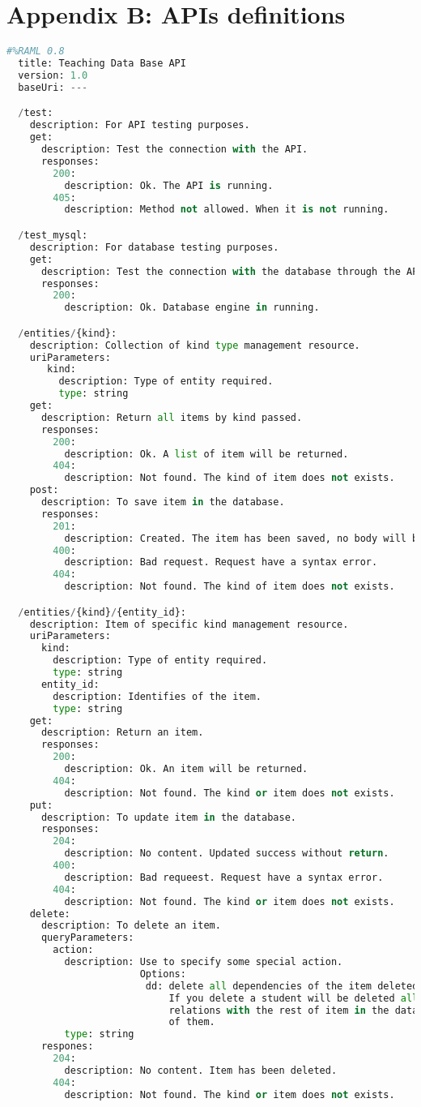 \section{\\Appendix B: APIs definitions}

\begin{lstlisting}[language=python,frame=none]
  #%RAML 0.8
  title: Teaching Data Base API
  version: 1.0
  baseUri: ---

  /test:
    description: For API testing purposes.
    get:
      description: Test the connection with the API.
      responses:
        200:
          description: Ok. The API is running.
        405:
          description: Method not allowed. When it is not running.

  /test_mysql:
    description: For database testing purposes.
    get:
      description: Test the connection with the database through the API.
      responses:
        200:
          description: Ok. Database engine in running.

  /entities/{kind}:
    description: Collection of kind type management resource.
    uriParameters:
       kind:
         description: Type of entity required.
         type: string
    get:
      description: Return all items by kind passed.
      responses:
        200:
          description: Ok. A list of item will be returned.
        404:
          description: Not found. The kind of item does not exists.
    post:
      description: To save item in the database.
      responses:
        201:
          description: Created. The item has been saved, no body will be returned.
        400:
          description: Bad request. Request have a syntax error.
        404:
          description: Not found. The kind of item does not exists.

  /entities/{kind}/{entity_id}:
    description: Item of specific kind management resource.
    uriParameters:
      kind:
        description: Type of entity required.
        type: string
      entity_id:
        description: Identifies of the item.
        type: string
    get:
      description: Return an item.
      responses:
        200:
          description: Ok. An item will be returned.
        404:
          description: Not found. The kind or item does not exists.
    put:
      description: To update item in the database.
      responses:
        204:
          description: No content. Updated success without return.
        400:
          description: Bad requeest. Request have a syntax error.
        404:
          description: Not found. The kind or item does not exists.
    delete:
      description: To delete an item.
      queryParameters:
        action:
          description: Use to specify some special action.
                       Options:
                        dd: delete all dependencies of the item deleted.
                            If you delete a student will be deleted all
                            relations with the rest of item in the database
                            of them.
          type: string
      respones:
        204:
          description: No content. Item has been deleted.
        404:
          description: Not found. The kind or item does not exists.



\end{lstlisting}
